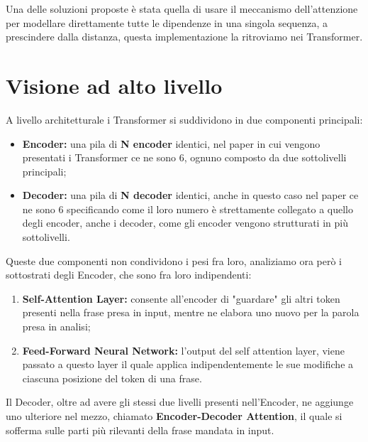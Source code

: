 Una delle soluzioni proposte è stata quella di usare il meccanismo dell'attenzione per modellare direttamente tutte le dipendenze in una singola sequenza, a prescindere dalla distanza, questa implementazione la ritroviamo nei Transformer.

\section{Visione ad alto livello}
A livello architetturale i Transformer si suddividono in due componenti principali:
\begin{itemize}
    \item \textbf{Encoder:} una pila di \textbf{N encoder} identici, nel paper in cui vengono presentati i Transformer ce ne sono 6, ognuno composto da due sottolivelli principali;
    \item \textbf{Decoder:} una pila di \textbf{N decoder} identici, anche in questo caso nel paper ce ne sono 6 specificando come il loro numero è strettamente collegato a quello degli encoder, anche i decoder, come gli encoder vengono strutturati in più sottolivelli.
\end{itemize}

Queste due componenti non condividono i pesi fra loro, analiziamo ora però i sottostrati degli Encoder, che sono fra loro indipendenti:

\begin{enumerate}
    \item \textbf{Self-Attention Layer:} consente all'encoder di "guardare" gli altri token presenti nella frase presa in input, mentre ne elabora uno nuovo per la parola presa in analisi;
    \item \textbf{Feed-Forward Neural Network:} l'output del self attention layer, viene passato a questo layer il quale applica indipendentemente le sue modifiche a ciascuna posizione del token di una frase.
\end{enumerate}

Il Decoder, oltre ad avere gli stessi due livelli presenti nell'Encoder, ne aggiunge uno ulteriore nel mezzo, chiamato \textbf{Encoder-Decoder Attention}, il quale si sofferma sulle parti più rilevanti della frase mandata in input.

